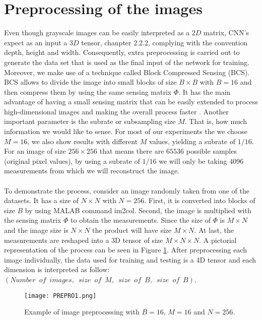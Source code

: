 \section{Preprocessing of the images} \label{sec:prepro}
Even though grayscale images can be easily interpreted as a $2D$ matrix, CNN's expect as an input a $3D$ tensor, chanpter 2.2.2, complying with the convention depth, height and width. Consequently, extra preprocessing is carried out to generate the data set that is used as the final input of the network for training. Moreover, we make use of a technique called Block Compressed Sensing (BCS). BCS allows to divide the image into small blocks of size $B \times B$ with $B=16$ and then compress them by using the same sensing matrix $\Phi$. It has the main advantage of having a small sensing matrix that can be easily extended to process high-dimensional images and making the overall process faster \cite{gan2007block, fowler2012block}. Another important parameter is the subrate or subsampling size $M$. That is, how much information we would like to sense. For most of our experiments the we choose $M=16$, we also show results with different $M$ values, yielding a subrate of $1/16$. For an image of size $256 \times 256$ that means there are $65536$ possible samples (original pixel values), by using a subrate of $1/16$ we will only be taking $4096$ measurements from which we will reconstruct the image.          \
\\\\
To demonstrate the process, consider an image randomly taken from one of the datasets. It has a size of $N \times N$ with $N=256$. First, it is converted into  blocks of size $B$ by using MALAB command im2col. Second, the image is multiplied with the sensing matrix $\Phi$ to obtain the measurements. Since the size of $\Phi$ is $M \times N $ and the image size is $N \times N$ the product will have size $M \times N$. At last, the measurements are reshaped into a 3D tensor of size $M \times N \times N$. A pictorial representation of the process can be seen in Figure \ref{fig:PREPROim1}. After preprocessing each image individually, the data used for training and testing is a 4D tensor and each dimension is interpreted as follow: $(Number \enspace of \enspace images, \enspace size \enspace of \enspace M ,\enspace size \enspace of \enspace B , \enspace size \enspace of \enspace B)$.  
\begin{figure}[tb] 
\centering 
\texttt{[image: PREPRO1.png]} 
\caption[Preprocessing of images]{Example of image preprocessing  with $B=16$, $M=16$ and $N=256$.}
\label{fig:PREPROim1} 
\end{figure}

